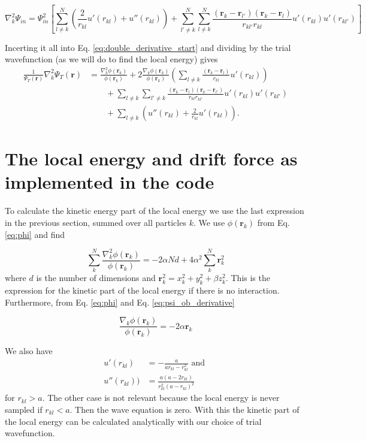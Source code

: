 $$\nabla^2_k\Psi_{in} = \Psi^2_{in} \left[\sum^N_{l \neq k} \left( \frac{2}{r_{kl}}u'(r_{kl}) + u''(r_{kl})\right) +   \sum^N_{l' \neq k} \sum^N_{l \neq k} \frac{(\mathbf{r}_k - \mathbf{r}_{l'})(\mathbf{r}_k - \mathbf{r}_{l})}{r_{kl'}r_{kl}}  u'(r_{kl})u'(r_{kl'}) \right] $$

Incerting it all into Eq. \ref{eq:double_derivative_start} and dividing by the trial wavefunction (as we will do to find the local energy) gives
\begin{align*}
   \frac{1}{\Psi_T(\mathbf{r})}\nabla_k^2\Psi_T(\mathbf{r})
   &= \frac{\nabla_k^2\phi(\mathbf{r}_k)}{\phi(\mathbf{r}_k)}
   + 2\frac{\nabla_k\phi(\mathbf{r}_k)}{\phi(\mathbf{r}_k)}
   \left(\sum_{l\ne k}\frac{(\mathbf{r}_k-\mathbf{r}_l)}{r_{kl}}u'(r_{kl})\right)
   \\
   &\qquad
   + \sum_{l\ne k}\sum_{l' \ne k}\frac{(\mathbf{r}_k-\mathbf{r}_l)(\mathbf{r}_k-\mathbf{r}_{l'})}{r_{kl}r_{kl'}}u'(r_{kl})u'(r_{kl'})
   \\
   &\qquad
   + \sum_{l\ne k}\left( u''(r_{kl})+\frac{2}{r_{kl}}u'(r_{kl})\right).
\end{align*}

\section{The local energy and drift force as implemented in the code}\label{sec:implementation}

To calculate the kinetic energy part of the local energy we use the last expression in the previous section, summed over all particles $k$. We use $\phi(\mathbf{r}_k)$ from Eq. \ref{eq:phi} and find 

$$ \sum_k^N\frac{\nabla_k^2\phi(\mathbf{r}_k)}{\phi(\mathbf{r}_k)} = -2\alpha Nd + 4 \alpha^2 \sum_k^N \mathbf{r}_k^2 $$ where $d$ is the number of dimensions and $\mathbf{r}_k^2 = x_k^2 + y_k^2+\beta z_k^2$. This is the expression for the kinetic part of the local energy if there is no interaction. Furthermore, from Eq. \ref{eq:phi} and Eq. \ref{eq:psi_ob_derivative}

$$ \frac{\nabla_k\phi(\mathbf{r}_k)}{\phi(\mathbf{r}_k)} = -2\alpha  \mathbf{r}_k $$
 
We also have
\begin{align*}
u'(r_{kl}) &= -\frac{a}{ar_{kl}-r_{kl}^2} \text{ and }\\
u''(r_{kl}) ) &= \frac{a(a-2r_{kl})}{r_{kl}^2(a-r_{kl})^2}
\end{align*} for $r_{kl} > a$. The other case is not relevant because the local energy is never sampled if $r_{kl} < a$. Then the wave equation is zero. With this the kinetic part of the local energy can be calculated analytically with our choice of trial wavefunction.

